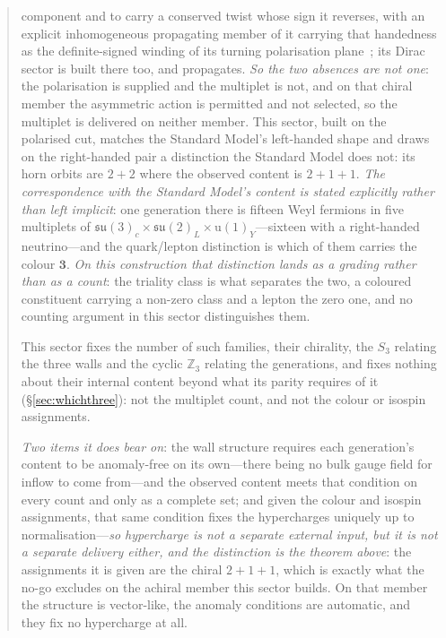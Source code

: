 \documentclass[11pt]{article}
\newcommand{\su}{\mathfrak{su}}
\begin{document}
\begin{abstract}
{component and to carry a conserved twist whose sign it reverses, with an explicit
inhomogeneous propagating member of it carrying that handedness as the definite-signed
winding of its turning polarisation plane~\cite{JanzenDynamics}; its Dirac sector is built there
too, and propagates.  \emph{So the two absences are not one}: the polarisation is
supplied and the multiplet is not, and on that chiral member the asymmetric action is permitted and not
selected, so the multiplet is delivered on neither member.  This sector, built on the polarised cut, matches the
Standard Model's left-handed shape and draws on the right-handed pair a distinction the Standard
Model does not: its horn orbits are $2{+}2$ where the observed content is $2{+}1{+}1$.} \emph{The correspondence with the Standard Model's content is stated explicitly rather than left implicit}: one generation there is fifteen Weyl fermions in five multiplets of $\su(3)_c\times\su(2)_L\times\mathrm{u}(1)_Y$---sixteen with a right-handed neutrino---and the quark/lepton distinction is which of them carries the colour $\mathbf{3}$. \emph{On this construction that distinction lands as a grading rather than as a count}: the triality class is what separates the two, a coloured constituent carrying a non-zero class and a lepton the zero one, and no counting argument in this sector distinguishes them. 

This sector fixes the number of such families, their chirality, the $S_3$ relating the three walls and the cyclic $\mathbb{Z}_3$ relating the generations, and fixes nothing about their internal content beyond what its parity requires of it (\S\ref{sec:whichthree}): not the multiplet count, and not the colour or isospin assignments. 

\emph{Two items it does bear on}: the wall structure requires each generation's content to be anomaly-free on its own---there being no bulk gauge field for inflow to come from---and the observed content meets that condition on every count and only as a complete set; and given the colour and isospin assignments, that same condition fixes the hypercharges uniquely up to normalisation---\emph{so hypercharge is not a separate external input, but it is not a separate delivery either, and the distinction is the theorem above}: the assignments it is given are the chiral $2+1+1$, which is exactly what the no-go excludes on the achiral member this sector builds. On that member the structure is vector-like, the anomaly conditions are automatic, and they fix no hypercharge at all. 


\end{abstract}
\end{document}
